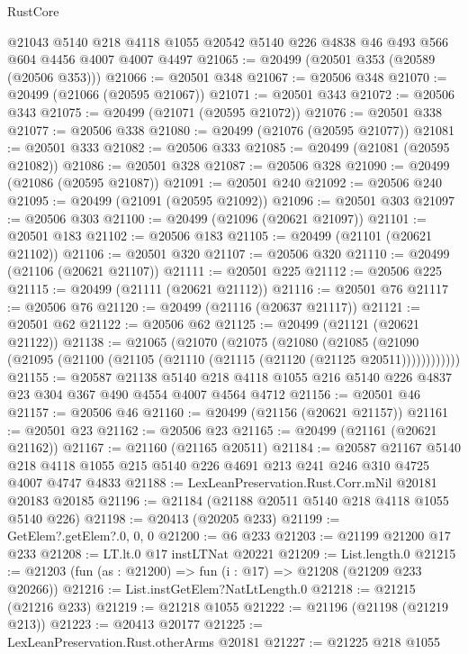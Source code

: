 \begin{lexlean}{RustCore}
\begin{coremodule}
    @21043
    @5140
    @218
    @4118
    @1055
    @20542
    @5140
    @226
    @4838
    @46
    @493
    @566
    @604
    @4456
    @4007
    @4007
    @4497
@21065 := @20499 (@20501 @353 (@20589 (@20506 @353)))
@21066 := @20501 @348
@21067 := @20506 @348
@21070 := @20499 (@21066 (@20595 @21067))
@21071 := @20501 @343
@21072 := @20506 @343
@21075 := @20499 (@21071 (@20595 @21072))
@21076 := @20501 @338
@21077 := @20506 @338
@21080 := @20499 (@21076 (@20595 @21077))
@21081 := @20501 @333
@21082 := @20506 @333
@21085 := @20499 (@21081 (@20595 @21082))
@21086 := @20501 @328
@21087 := @20506 @328
@21090 := @20499 (@21086 (@20595 @21087))
@21091 := @20501 @240
@21092 := @20506 @240
@21095 := @20499 (@21091 (@20595 @21092))
@21096 := @20501 @303
@21097 := @20506 @303
@21100 := @20499 (@21096 (@20621 @21097))
@21101 := @20501 @183
@21102 := @20506 @183
@21105 := @20499 (@21101 (@20621 @21102))
@21106 := @20501 @320
@21107 := @20506 @320
@21110 := @20499 (@21106 (@20621 @21107))
@21111 := @20501 @225
@21112 := @20506 @225
@21115 := @20499 (@21111 (@20621 @21112))
@21116 := @20501 @76
@21117 := @20506 @76
@21120 := @20499 (@21116 (@20637 @21117))
@21121 := @20501 @62
@21122 := @20506 @62
@21125 := @20499 (@21121 (@20621 @21122))
@21138 := @21065
    (@21070
      (@21075
        (@21080
          (@21085 (@21090 (@21095 (@21100 (@21105 (@21110 (@21115 (@21120 (@21125 @20511))))))))))))
@21155 := @20587
    @21138
    @5140
    @218
    @4118
    @1055
    @216
    @5140
    @226
    @4837
    @23
    @304
    @367
    @490
    @4554
    @4007
    @4564
    @4712
@21156 := @20501 @46
@21157 := @20506 @46
@21160 := @20499 (@21156 (@20621 @21157))
@21161 := @20501 @23
@21162 := @20506 @23
@21165 := @20499 (@21161 (@20621 @21162))
@21167 := @21160 (@21165 @20511)
@21184 := @20587
    @21167
    @5140
    @218
    @4118
    @1055
    @215
    @5140
    @226
    @4691
    @213
    @241
    @246
    @310
    @4725
    @4007
    @4747
    @4833
@21188 := LexLeanPreservation.Rust.Corr.mNil @20181 @20183 @20185
@21196 := @21184 (@21188 @20511 @5140 @218 @4118 @1055 @5140 @226)
@21198 := @20413 (@20205 @233)
@21199 := GetElem?.getElem?.{0, 0, 0}
@21200 := @6 @233
@21203 := @21199 @21200 @17 @233
@21208 := LT.lt.{0} @17 instLTNat @20221
@21209 := List.length.{0}
@21215 := @21203 (fun (as : @21200) => fun (i : @17) => @21208 (@21209 @233 @20266))
@21216 := List.instGetElem?NatLtLength.{0}
@21218 := @21215 (@21216 @233)
@21219 := @21218 @1055
@21222 := @21196 (@21198 (@21219 @213))
@21223 := @20413 @20177
@21225 := LexLeanPreservation.Rust.otherArms @20181
@21227 := @21225 @218 @1055

\end{coremodule}
\end{lexlean}
